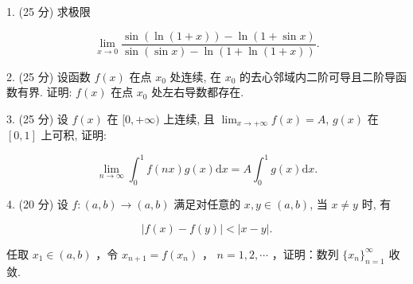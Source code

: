 \documentclass{examcollection}
\renewcommand{\displayformula}[1]{\[#1\]}
\begin{document}
{\begin{minipage}{\textwidth}
1. (25 分) 求极限\par
\displayformula{\lim _ {x \rightarrow 0} \frac {\sin (\ln (1 + x)) - \ln (1 + \sin x)}{\sin (\sin x) - \ln (1 + \ln (1 + x))}.}\par
2. (25 分) 设函数 $f(x)$ 在点 $x_0$ 处连续, 在 $x_0$ 的去心邻域内二阶可导且二阶导函数有界. 证明: $f(x)$ 在点 $x_0$ 处左右导数都存在.\par
3. (25 分) 设 $f(x)$ 在 $[0, +\infty)$ 上连续, 且 $\lim_{x \to +\infty} f(x) = A$, $g(x)$ 在 $[0, 1]$ 上可积, 证明:\par
\displayformula{\lim _ {n \rightarrow \infty} \int_ {0} ^ {1} f (n x) g (x) \mathrm{d} x = A \int_ {0} ^ {1} g (x) \mathrm{d} x.}\par
4. (20 分) 设 $f: (a, b) \to (a, b)$ 满足对任意的 $x, y \in (a, b)$, 当 $x \neq y$ 时, 有\par
\displayformula{| f (x) - f (y) | <   | x - y |.}\par
任取  $x_{1} \in (a, b)$ ，令  $x_{n+1} = f(x_{n})$ ， $n = 1, 2, \cdots$ ，证明：数列  $\{x_{n}\}_{n=1}^{\infty}$  收敛.\par
\end{minipage}}
\ifdim\dimexpr\ht\proofbox+\dp\proofbox\relax>\textheight
\noindent\resizebox{!}{\textheight}{\usebox{\proofbox}}\else\noindent\usebox{\proofbox}\fi\clearpage
\end{document}
